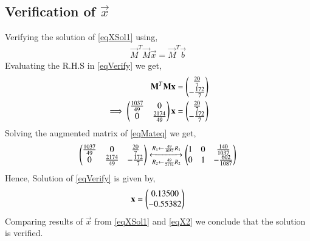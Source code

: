 \documentclass[journal,12pt,twocolumn]{IEEEtran}
\begin{document}
\subsection{Verification of $\vec{x}$}
Verifying the solution of \eqref{eqXSol1} using,
\begin{align}
	\vec{M}^T\vec{M}\vec{x} = \vec{M}^T\vec{b}\label{eqVerify}
\end{align}
Evaluating the R.H.S in \eqref{eqVerify} we get,
\begin{align}
	\mathbf{M}^T\mathbf{M}\mathbf{x} &= \begin{pmatrix}\frac{20}{7}\\ - \frac{172}{7}\end{pmatrix}\\
	\implies\begin{pmatrix}\frac{1037}{49} & 0 \\ 0 & \frac{2174}{49}\end{pmatrix}\mathbf{x} &= \begin{pmatrix}\frac{20}{7}\\ -\frac{172}{7}\end{pmatrix}\label{eqMateq}
\end{align}
Solving the augmented matrix of \eqref{eqMateq} we get,
\begin{align}
	\begin{pmatrix}\frac{1037}{49} & 0 & \frac{20}{7} \\ 0 & \frac{2174}{49} & -\frac{172}{7}\end{pmatrix} 
	\xleftrightarrow[R_2 \leftarrow \frac{49}{2174}R_2]{R_1 \leftarrow \frac{49}{1037}R_1}
	\begin{pmatrix}1 & 0 & \frac{140}{1037} \\ 0 & 1 & -\frac{602}{1087}\end{pmatrix}
\end{align}
Hence, Solution of \eqref{eqVerify} is given by,
\begin{align}
	\mathbf{x}=\begin{pmatrix}0.13500 \\ -0.55382\end{pmatrix}\label{eqX2}
\end{align}
Comparing results of $\vec{x}$ from \eqref{eqXSol1} and \eqref{eqX2} we conclude that the solution is verified.
\end{document}
